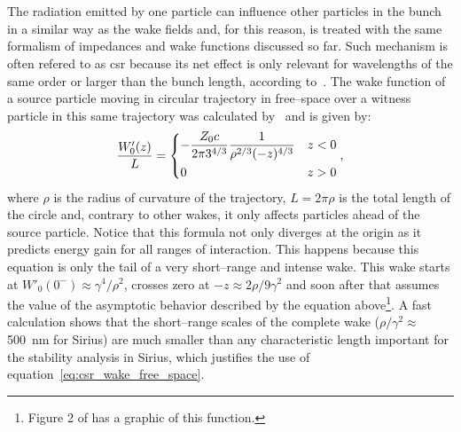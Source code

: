 \section{}
    The radiation emitted by one particle can influence other particles in the bunch in a similar way as the wake fields and, for this reason, is treated with the same formalism of impedances and wake functions discussed so far. Such mechanism is often refered to as \gls{csr} because its net effect is only relevant for wavelengths of the same order or larger than the bunch length, according to~. The wake function of a source particle moving in circular trajectory in free--space over a witness particle in this same trajectory was calculated by~ and is given by:
    \begin{align}\label{eq:csr_wake_free_space}
        \frac{W'_0(z)}{L} =
        \begin{dcases}
            -\frac{Z_0 c}{2 \pi 3^{4/3}} \frac{1}{\rho^{2/3}(-z)^{4/3}} & z<0\\
            0 & z>0
        \end{dcases},
    \end{align}
    where $\rho$ is the radius of curvature of the trajectory, $L=2\pi\rho$ is the total length of the circle and, contrary to other wakes, it only affects particles ahead of the source particle. Notice that this formula not only diverges at the origin as it predicts energy gain for all ranges of interaction. This happens because this equation is only the tail of a very short--range and intense wake. This wake starts at $W'_0(0^-)\approx\gamma^4/\rho^2$, crosses zero at $-z\approx 2\rho / 9\gamma^2$ and soon after that assumes the value of the asymptotic behavior described by the equation above\footnote{Figure 2 of   has a graphic of this function.}. A fast calculation shows that the short--range scales of the complete wake ($\rho/\gamma^2 \approx $\SI{500}{\nano\meter} for Sirius) are much smaller than any characteristic length important for the stability analysis in Sirius, which justifies the use of equation~\eqref{eq:csr_wake_free_space}.

